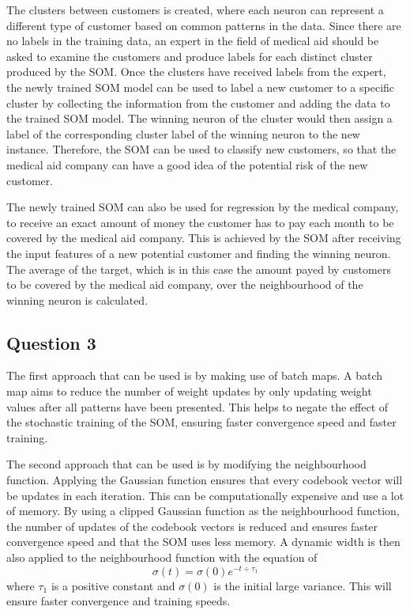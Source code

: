 \documentclass[10pt]{article}
\begin{document}
The clusters between customers is created, where each neuron can represent a different type of customer
based on common patterns in the data. Since there are no labels in the training data, an expert in the
field of medical aid should be asked to examine the customers and produce labels for each distinct cluster
produced by the SOM. Once the clusters have received labels from the expert, the newly trained SOM model can be used
to label a new customer to a specific cluster by collecting the information from the customer
and adding the data to the trained SOM model. The winning neuron of the cluster would then assign a label of the
corresponding cluster label of the winning neuron to the new instance. Therefore, the SOM can be used
to classify new customers, so that the medical aid company can have a good idea of the potential risk
of the new customer.

The newly trained SOM can also be used for regression by the medical company, to receive an exact
amount of money the customer has to pay each month to be covered by the medical aid company. This
is achieved by the SOM after receiving the input features of a new potential customer and finding the
winning neuron. The average of the target, which is in this case the amount payed by customers to be
covered by the medical aid company, over the neighbourhood of the winning neuron is calculated.

\subsection*{Question 3}

The first approach that can be used is by making use of batch maps. A batch map aims to reduce
the number of weight updates by only updating weight values after all patterns have been presented.
This helps to negate the effect of the stochastic training of the SOM, ensuring faster convergence
speed and faster training.

The second approach that can be used is by modifying the neighbourhood function. Applying the
Gaussian function ensures that every codebook vector will be updates in each iteration.
This can be computationally expensive and use a lot of memory. By using a clipped Gaussian function
as the neighbourhood function, the number of updates of the codebook vectors is reduced and ensures
faster convergence speed and that the SOM uses less memory. A dynamic width is then also applied to
the neighbourhood function with the equation of
\begin{equation*}
    \sigma (t) = \sigma(0)e^{-t \div \tau_1}
\end{equation*}
where $\tau_1$ is a positive constant and $\sigma(0)$ is the initial large variance.
This will ensure faster convergence and training speeds.
\end{document}
